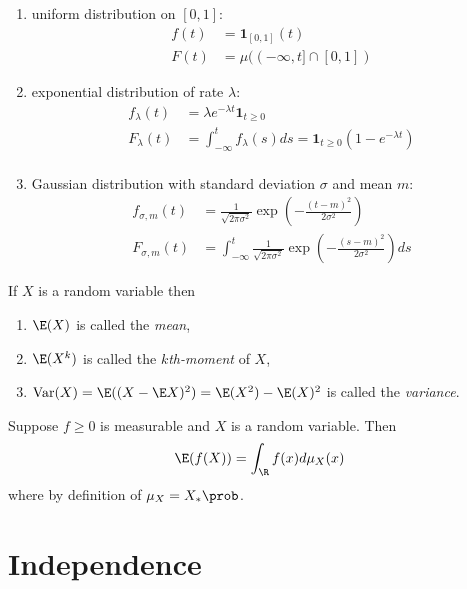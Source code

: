 \documentclass[a4paper]{article}
\renewcommand{\P}{\prob} %
\DeclareMathOperator{\var}{Var} %
\begin{document}
\begin{eg}\leavevmode
  \begin{enumerate}
  \item uniform distribution on \([0, 1]\):
    \begin{align*}
      f(t) &= \mathbf 1_{[0, 1]}(t) \\
      F(t) &= \mu((-\infty, t] \cap [0, 1])
    \end{align*}
  \item exponential distribution of rate \(\lambda\):
    \begin{align*}
      f_\lambda(t) &= \lambda e^{-\lambda t} \mathbf 1_{t \geq 0} \\
      F_\lambda(t) &= \int_{-\infty}^t f_\lambda(s) ds = \mathbf 1_{t \geq 0} (1 - e^{-\lambda t}) \\
      \end{align*}
    \item Gaussian distribution with standard deviation \(\sigma\) and mean \(m\):
      \begin{align*}
        f_{\sigma, m}(t) &= \frac{1}{\sqrt{2\pi \sigma^2}} \exp(- \frac{(t - m)^2}{2\sigma^2}) \\
        F_{\sigma, m}(t) & = \int_{-\infty}^t \frac{1}{\sqrt{2\pi \sigma^2}} \exp (- \frac{(s - m)^2}{2\sigma^2}) ds
      \end{align*}
  \end{enumerate}
\end{eg}

\begin{definition}
  If \(X\) is a random variable then
  \begin{enumerate}
  \item \(\E(X)\) is called the \emph{mean},
  \item \(\E(X^k)\) is called the \emph{\(k\)th-moment} of \(X\),
  \item \(\var(X) = \E((X - \E X)^2) = \E(X^2) - \E(X)^2\) is called the \emph{variance}.
  \end{enumerate}
\end{definition}

\begin{remark}
  Suppose \(f \geq 0\) is measurable and \(X\) is a random variable. Then
  \[
    \E(f(X)) = \int_\R f(x) d \mu_X(x)
  \]
  where by definition of \(\mu_X = X_* \P\).
\end{remark}

\section{Independence}
\end{document}
